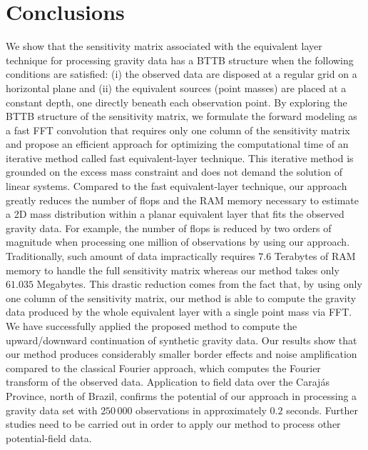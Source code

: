 \section{Conclusions}

We show that the sensitivity matrix associated with the equivalent layer technique 
for processing gravity data has a BTTB structure when the following conditions are
satisfied: (i) the observed data are disposed at a regular grid on a horizontal plane
and (ii) the equivalent sources (point masses) are placed at a constant depth, one directly 
beneath each observation point.
By exploring the BTTB structure of the sensitivity matrix, we formulate the forward modeling as a 
fast FFT convolution that requires only one column of the sensitivity matrix 
and propose an efficient approach for optimizing the computational time of an 
iterative method called fast equivalent-layer technique.
This iterative method is grounded on the excess mass constraint and does not demand the solution of 
linear systems.
Compared to the fast equivalent-layer technique, 
our approach greatly reduces the number of flops and the RAM memory necessary to estimate a 
2D mass distribution within a planar equivalent layer that fits the observed gravity data. 
For example, the number of flops is reduced by two orders 
of magnitude when processing one million of observations by using our approach. 
Traditionally, such amount of data impractically requires $7.6$ Terabytes of RAM memory to handle 
the full sensitivity matrix whereas our method takes only $61.035$ Megabytes.
This drastic reduction comes from the fact that, by using only one column of the sensitivity matrix,
our method is able to compute the gravity data produced by the whole equivalent layer with a single 
point mass via FFT.
We have successfully applied the proposed method to compute the upward/downward continuation of 
synthetic gravity data. 
Our results show that our method produces considerably smaller border effects and 
noise amplification compared to the classical Fourier approach, 
which computes the Fourier transform of the observed data.
Application to field data over the Caraj{\'a}s Province, north of Brazil, 
confirms the potential of our approach in processing a gravity data set with $250\,000$ observations in approximately $0.2$ seconds. Further studies need to be carried out in order to apply our method to process other potential-field data.